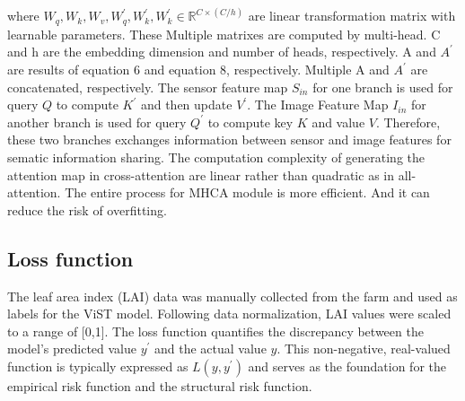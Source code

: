 \documentclass[acmsmall,manuscript, screen, review]{acmart}
\begin{document}
where  \begin{math}
  W_q,W_k,W_v,W_q^\prime, W_k^\prime, W_k^\prime \in \mathbb{R}^{C\times\left(C/h\right)}
\end{math} are linear transformation matrix with learnable parameters. These Multiple matrixes are computed by multi-head.  C and h are the embedding dimension and number of heads, respectively. A and \begin{math}
  A^\prime
\end{math} are results of equation 6 and equation 8, respectively. Multiple A and \begin{math}
  A^\prime
\end{math} are concatenated, respectively. The sensor feature map \begin{math}
  S_{in}
\end{math} for one branch is used for query \begin{math}
  Q
\end{math} to compute \begin{math}
  K^\prime
\end{math} and then update \begin{math}
  V^\prime
\end{math}. The Image Feature Map \begin{math}
  I_{in}
\end{math} for another branch is used for query \begin{math}
  Q^\prime
\end{math} to compute key \begin{math}
  K
\end{math} and value \begin{math}
  V
\end{math}. Therefore, these two branches exchanges information between sensor and image features for sematic information sharing. The computation complexity of generating the attention map in cross-attention are linear rather than quadratic as in all-attention. The entire process for MHCA module is more efficient. And it can reduce the risk of overfitting.


\subsection{Loss function}
The leaf area index (LAI) data was manually collected from the farm and used as labels for the ViST model. Following data normalization, LAI values were scaled to a range of [0,1]. The loss function quantifies the discrepancy between the model's predicted value \begin{math}
  y^\prime
\end{math} and the actual value \begin{math}
  y
\end{math}. This non-negative, real-valued function is typically expressed as \begin{math}
  L(y, y^\prime)
\end{math} and serves as the foundation for the empirical risk function and the structural risk function.
\end{document}
